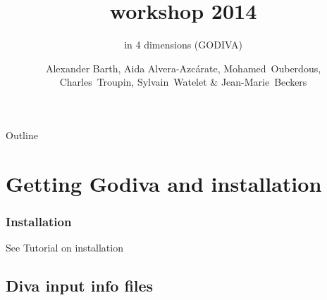 
\parindent 0cm

\author[Alexander Barth, Aida Alvera-Azc\'{a}rate, Mohamed~Ouberdous, Charles~Troupin, Sylvain~Watelet \& Jean-Marie~Beckers]{Alexander Barth, Aida Alvera-Azc\'{a}rate, Mohamed~Ouberdous,\\
 Charles~Troupin, Sylvain~Watelet \& Jean-Marie~Beckers}
  
\title[]{\diva workshop 2014}
\subtitle{\diva in 4 dimensions (GODIVA)}
\date{}


\maketitlepage %





\begin{frame}{Outline}
  \tableofcontents
\end{frame}


\section{Getting Godiva and installation}


\begin{frame}[c]
\frametitle{Installation}
\huge
See Tutorial on installation \href{run:./DivaWorkshop2014_installation.pdf}{}


\end{frame}


\subsection{Diva input info files}

